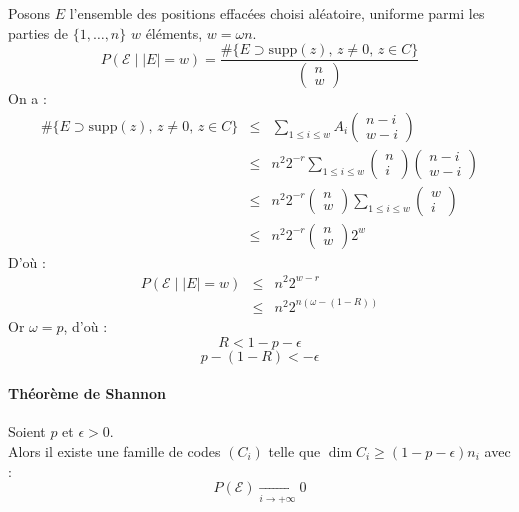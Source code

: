 \documentclass[12pt,a4paper]{report}
\begin{document}
Posons $E$ l'ensemble des positions effacées choisi aléatoire, uniforme parmi les parties de $\{1,\ldots,n\}$  $w$ éléments, $w = \omega n$.
$$ P(\mathcal{E} \mid |E| = w) = \frac{\# \{E \supset \mbox{supp}(z),\,z \neq 0, \, z\in C\}}{\left(\begin{array}{c}
n \\
w \end{array}\right)}$$
On a :
$$\begin{array}{ccl}
\# \{E \supset \mbox{supp}(z),\,z \neq 0, \, z\in C\} & \leqslant &\displaystyle \sum_{1\leqslant i \leqslant w} A_i \left(\begin{array}{c}
n-i \\
w-i \end{array}\right) \\
& \leqslant & \displaystyle n^2 2^{-r} \sum_{1\leqslant i \leqslant w} \left(\begin{array}{c}
n \\
i \end{array}\right) \left(\begin{array}{c}
n-i \\
w-i \end{array}\right)\\
& \leqslant & \displaystyle n^2 2^{-r}  \left(\begin{array}{c}
n \\
w \end{array}\right) \sum_{1\leqslant i \leqslant w} \left(\begin{array}{c}
w \\
i \end{array}\right) \\
& \leqslant & \displaystyle n^2 2^{-r}  \left(\begin{array}{c}
n \\
w \end{array}\right) 2^w 

\end{array}$$
D'où : 
$$ \begin{array}{ccl}
 P(\mathcal{E} \mid |E| = w) & \leqslant & n^2 2^{w-r} \\
 & \leqslant & n^2 2^{n(\omega - (1-R))} \end{array} $$
Or $\omega = p$, d'où :
$$ R < 1-p-\epsilon $$
$$ p -(1-R) < -\epsilon $$
\paragraph{Théorème de Shannon\\}
Soient $p$ et $\epsilon > 0$. \\
Alors il existe une famille de codes $(C_i)$ telle que $\dim C_i \geqslant (1-p-\epsilon)n_i $ avec :
$$ P(\mathcal{E}) \underset{i\rightarrow + \infty}{\rightarrow} 0 $$
\end{document}
